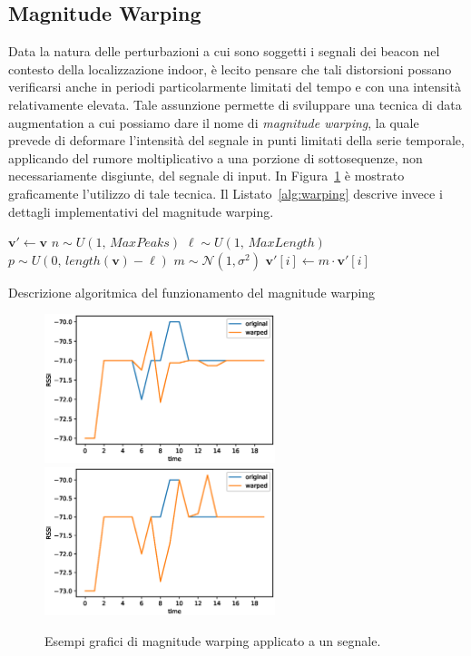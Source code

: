 \subsection{Magnitude Warping}
Data la natura delle perturbazioni a cui sono soggetti i segnali dei beacon nel
contesto della localizzazione indoor, è lecito pensare che tali distorsioni
possano verificarsi anche in periodi particolarmente limitati del tempo e con
una intensità relativamente elevata. Tale assunzione permette di sviluppare una
tecnica di data augmentation a cui possiamo dare il nome di \emph{magnitude
  warping}, la quale prevede di deformare l'intensità del segnale in punti
limitati della serie temporale, applicando del rumore moltiplicativo a una
porzione di sottosequenze, non necessariamente disgiunte, del segnale di input.
In Figura~\ref{fig:warping} è mostrato graficamente l'utilizzo di tale tecnica.
Il Listato~\ref{alg:warping} descrive invece i dettagli implementativi del
magnitude warping.
\begin{algorithm}%
  \begin{algorithmic}
      \State $\bm v' \gets \bm v$
      \State $n \sim U(1,\, \mathit{MaxPeaks})$
        \State $\ell \sim U(1,\, \mathit{MaxLength})$
        \State $p \sim U(0,\, length(\bm v) - \ell)$
        \State $m \sim \mathcal{N}(1, \sigma^2)$
        \State $\bm v'[i] \gets m \cdot \bm v'[i]$
        \EndFor
      \EndFor
    \EndFunction
  \end{algorithmic}
  \caption{Descrizione algoritmica del funzionamento del magnitude warping}
  \label{alg:warping}
\end{algorithm}

\begin{figure}[!tp]
  \centering
  \includegraphics[width=0.60\textwidth]{./img/warping.eps}
  \includegraphics[width=0.60\textwidth]{./img/warping2.eps}
  \caption{Esempi grafici di magnitude warping applicato a un segnale.}%
  \label{fig:warping}%
\end{figure}

